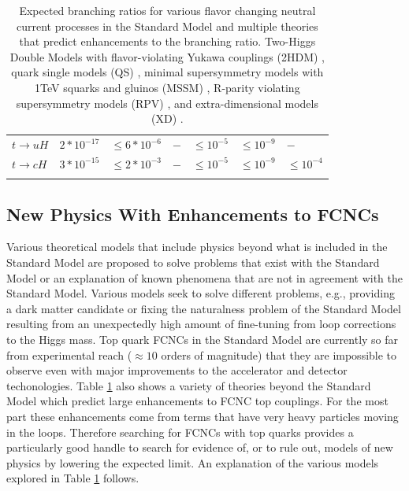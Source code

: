 \begin{table}[]
\begin{center}
\begin{tabular}{lllllll}
$t\rightarrow u H                    $ & $ 2*10^{-17} $  & $ \leq 6*10^{-6} $ & $ -                      $ & $ \leq 10^{-5} $ & $ \leq 10^{-9} $     & $ -    $                                           \\
$t\rightarrow c H                    $ & $ 3*10^{-15} $  & $ \leq 2*10^{-3} $ & $ -                      $ & $ \leq 10^{-5} $ & $ \leq 10^{-9} $     & $ \leq 10^{-4} $ \\
\hhline{=======}
\end{tabular}
	\caption[Expected branching ratios for various flavor changing neutral current processes in the Standard Model and multiple theories that predict enhancements to the branching ratio.  Two-Higgs Double Models with flavor-violating Yukawa couplings (2HDM), quark single models (QS), minimal supersymmetry models with 1TeV squarks and gluinos (MSSM), R-parity violating supersymmetry models (RPV), and extra-dimensional models (XD).]{Expected branching ratios for various flavor changing neutral current processes in the Standard Model\cite{2HDM-2} and multiple theories that predict enhancements to the branching ratio.  Two-Higgs Double Models with flavor-violating Yukawa couplings (2HDM) \cite{2HDM-2,2HDM-3}, quark single models (QS) \cite{QS-1,QS-2}, minimal supersymmetry models with 1TeV squarks and gluinos (MSSM) \cite{MSSM}, R-parity violating supersymmetry models (RPV) \cite{RPVSusyFCNC}, and extra-dimensional models (XD) \cite{XDFCNC}.}
	\label{tab:FCNCLimits}
\end{center}
\end{table}

\subsection{New Physics With Enhancements to FCNCs}
\label{sec:bsmFCNC}
Various theoretical models that include physics beyond what is included in the Standard Model are proposed to solve problems that exist with the Standard Model or an explanation of known phenomena that are not in agreement with the Standard Model.  Various models seek to solve different problems, e.g., providing a dark matter candidate or fixing the naturalness problem of the Standard Model resulting from an unexpectedly high amount of fine-tuning from loop corrections to the Higgs mass.  
Top quark FCNCs in the Standard Model are currently so far from experimental reach ($\approx 10$ orders of magnitude) that they are impossible to observe even with major improvements to the accelerator and detector techonologies.  Table \ref{tab:FCNCLimits} also shows a variety of theories beyond the Standard Model which predict large enhancements to FCNC top couplings.  For the most part these enhancements come from terms that have very heavy particles moving in the loops.  Therefore searching for FCNCs with top quarks provides a particularly good handle to search for evidence of, or to rule out, models of new physics by lowering the expected limit.  An explanation of the various models explored in Table \ref{tab:FCNCLimits} follows.

